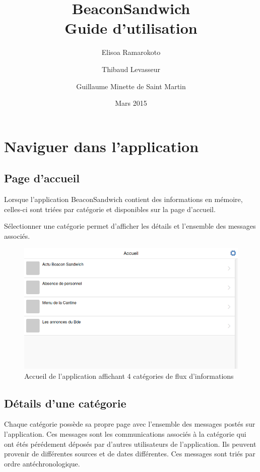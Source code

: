\documentclass{report}
\title{\textbf{BeaconSandwich} \\ Guide d'utilisation}
\author{Elisoa Ramarokoto \and Thibaud Levasseur \and Guillaume Minette de Saint Martin }
\date{Mars 2015}
\begin{document}
\maketitle
\tableofcontents

\chapter{Naviguer dans l'application}

\section{Page d'accueil}

Lorsque l'application BeaconSandwich contient des informations en mémoire, celles-ci sont triées par catégorie et disponibles sur la page d'accueil.

Sélectionner une catégorie permet d'afficher les détails et l'ensemble des messages associés.

\begin{figure}[h]
	\centering
	\includegraphics[scale=0.28]{menu.png}
	\caption{Accueil de l'application affichant 4 catégories de flux d'informations}
\end{figure}

\section{Détails d'une catégorie}

Chaque catégorie possède sa propre page avec l'ensemble des messages postés sur l'application. Ces messages sont les communications associés à la catégorie qui ont étés pérédement déposés par d'autres utilisateurs de l'application. Ils peuvent provenir de différentes sources et de dates différentes. Ces messages sont triés par ordre antéchronologique.
\end{document}
